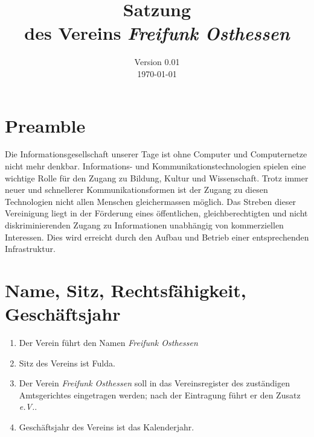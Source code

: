 \documentclass[ngerman]{article}
\title{Satzung\\
des Vereins \emph{Freifunk Osthessen}}
\date{Version 0.01\\
\today}
\begin{document}
\maketitle

\thispagestyle{empty}
\pagebreak

\section{Preamble}
Die Informationsgesellschaft unserer Tage ist ohne Computer und Computernetze nicht mehr denkbar.
Informations- und Kommunikationstechnologien spielen eine wichtige Rolle für den Zugang zu Bildung, Kultur und Wissenschaft.
Trotz immer neuer und schnellerer Kommunikationsformen ist der Zugang zu diesen Technologien nicht allen Menschen gleichermassen möglich.
Das Streben dieser Vereinigung liegt in der Förderung eines öffentlichen, gleichberechtigten und nicht diskriminierenden Zugang zu Informationen unabhängig von kommerziellen Interessen.
Dies wird erreicht durch den Aufbau und Betrieb einer entsprechenden Infrastruktur.

\section{Name, Sitz, Rechtsfähigkeit, Geschäftsjahr}
\begin{enumerate}
  \item Der Verein führt den Namen \emph{Freifunk Osthessen}
  \item Sitz des Vereins ist Fulda.
  \item Der Verein \emph{Freifunk Osthessen} soll in das Vereinsregister des zuständigen Amtsgerichtes eingetragen werden; nach der Eintragung führt er den Zusatz \emph{e.V.}.
  \item Geschäftsjahr des Vereins ist das Kalenderjahr.
\end{enumerate}
\end{document}
